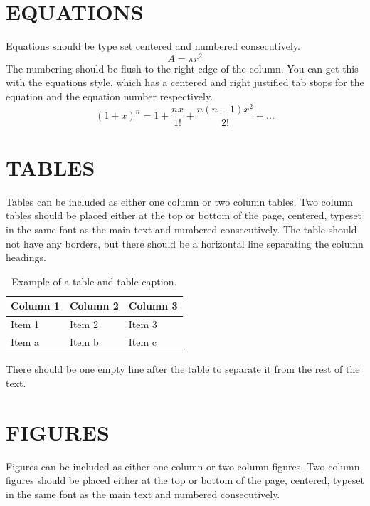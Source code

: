 \documentclass{cfm_paper}
\begin{document}
\section*{EQUATIONS}
Equations should be type set centered and numbered consecutively.
\begin{equation} %
    A = \pi r^2
\end{equation}
The numbering should be flush to the right edge of the column. You can get this with the equations style, which has a centered and right justified tab stops for the equation and the equation number respectively.
\begin{equation}
    (1+x)^n = 1 + \frac{nx}{1!}+\frac{n(n-1)x^2}{2!}+...
\end{equation}

\section*{TABLES}
Tables can be included as either one column or two column tables. Two column tables should be placed either at the top or bottom of the page, centered, typeset in the same font as the main text and numbered consecutively. The table should not have any borders, but there should be a horizontal line separating the column headings.


\begin{table}[h]
    \caption{Example of a table and table caption.} %
    \label{tab:ExampleTable}
    \begin{tabularx}{\columnwidth}{XXX} %
        \toprule %
        Column 1 & Column 2 & Column 3 \\
        \midrule %
        Item 1   & Item 2   & Item 3   \\
        Item a   & Item b   & Item c   \\
        \bottomrule
    \end{tabularx}
\end{table}

There should be one empty line after the table to separate it from the rest of the text.

\section*{FIGURES}
Figures can be included as either one column or two column figures. Two column figures should be placed either at the top or bottom of the page, centered, typeset in the same font as the main text and numbered consecutively.
\end{document}
